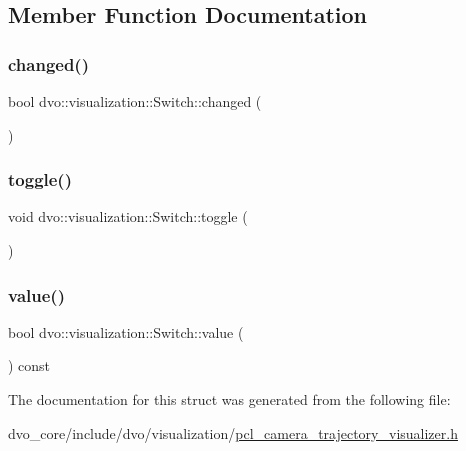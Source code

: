 \subsection{Member Function Documentation}
\mbox{\label{structdvo_1_1visualization_1_1_switch_a2c81c1498c9d450c6e8aae1173045954}} 
\subsubsection{\texorpdfstring{changed()}{changed()}}
{\footnotesize\ttfamily bool dvo\+::visualization\+::\+Switch\+::changed (\begin{DoxyParamCaption}{ }\end{DoxyParamCaption})\hspace{0.3cm}{\ttfamily [inline]}}

\mbox{\label{structdvo_1_1visualization_1_1_switch_af618d5fd5a327abf0873defe1532a2c3}} 
\subsubsection{\texorpdfstring{toggle()}{toggle()}}
{\footnotesize\ttfamily void dvo\+::visualization\+::\+Switch\+::toggle (\begin{DoxyParamCaption}{ }\end{DoxyParamCaption})\hspace{0.3cm}{\ttfamily [inline]}}

\mbox{\label{structdvo_1_1visualization_1_1_switch_ab4e0d6e3033221e4d052ac0b89b118d1}} 
\subsubsection{\texorpdfstring{value()}{value()}}
{\footnotesize\ttfamily bool dvo\+::visualization\+::\+Switch\+::value (\begin{DoxyParamCaption}{ }\end{DoxyParamCaption}) const\hspace{0.3cm}{\ttfamily [inline]}}



The documentation for this struct was generated from the following file\+:\begin{DoxyCompactItemize}
\item 
dvo\+\_\+core/include/dvo/visualization/\mbox{\hyperlink{pcl__camera__trajectory__visualizer_8h}{pcl\+\_\+camera\+\_\+trajectory\+\_\+visualizer.\+h}}\end{DoxyCompactItemize}
